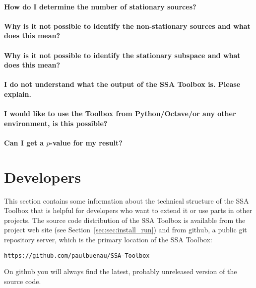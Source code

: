 \documentclass{article}
\newcommand{\1}{\ensuremath{\mathds{1}}}
\newcommand{\0}{\ensuremath{0}}
\begin{document}
\paragraph{How do I determine the number of stationary sources?}

\paragraph{Why is it not possible to identify the non-stationary sources and what does this mean?}
	
\paragraph{Why is it not possible to identify the stationary subspace and what does this mean?}

\paragraph{I do not understand what the output of the SSA Toolbox is. Please explain.}

\paragraph{I would like to use the Toolbox from Python/Octave/or any other environment, is this possible?}

\paragraph{Can I get a $p$-value for my result?}

\section{Developers}

This section contains some information about the technical structure of the SSA Toolbox
that is helpful for developers who want to extend it or use parts in other projects. The 
source code distribution of the SSA Toolbox is available from the project 
web site (see Section~\ref{sec:sec:install_run}) and from github, a public git repository 
server, which is the primary location of the SSA Toolbox:
\begin{center}
	\texttt{https://github.com/paulbuenau/SSA-Toolbox}
\end{center}
On github you will always find the latest, probably unreleased version of the source code. 
\end{document}
